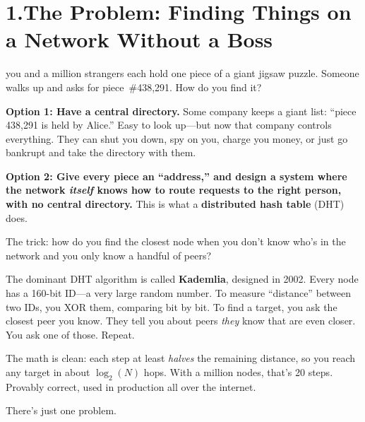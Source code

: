 \documentclass[nobib,justified]{tufte-handout}
\begin{document}
\section{1.\quad The Problem: Finding Things on a Network Without a Boss}

 you and a million strangers each hold one piece of a giant jigsaw puzzle. Someone walks up and asks for piece~\#438{,}291. How do you find it?

\textbf{Option 1: Have a central directory.} Some company keeps a giant list: ``piece 438{,}291 is held by Alice.'' Easy to look up---but now that company controls everything. They can shut you down, spy on you, charge you money, or just go bankrupt and take the directory with them.

\textbf{Option 2: Give every piece an ``address,'' and design a system where the network \emph{itself} knows how to route requests to the right person, with no central directory.} This is what a \textbf{distributed hash table} (DHT) does.

The trick: how do you find the closest node when you don't know who's in the network and you only know a handful of peers?

The dominant DHT algorithm is called \textbf{Kademlia}, designed in 2002. Every node has a 160-bit ID---a very large random number. To measure ``distance'' between two IDs, you XOR them, comparing bit by bit. To find a target, you ask the closest peer you know. They tell you about peers \emph{they} know that are even closer. You ask one of those. Repeat.

The math is clean: each step at least \emph{halves} the remaining distance, so you reach any target in about $\log_2(N)$ hops. With a million nodes, that's 20 steps. Provably correct, used in production all over the internet.

There's just one problem.

\end{document}
